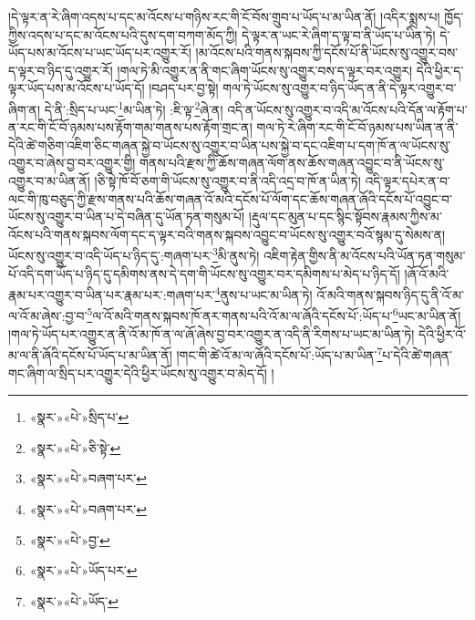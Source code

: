 །དེ་ལྟར་ན་རེ་ཞིག་འདས་པ་དང་མ་འོངས་པ་གཉིས་རང་གི་ངོ་བོས་གྲུབ་པ་ཡོད་པ་མ་ཡིན་ནོ། །འདིར་སྨྲས་པ། ཁྱོད་ཀྱིས་འདས་པ་དང་མ་འོངས་པའི་དུས་དག་བཀག་མོད་ཀྱི། དེ་ལྟར་ན་ཡང་རེ་ཞིག་ད་ལྟ་བ་ནི་ཡོད་པ་ཡིན་ཏེ། དེ་ཡོད་པས་མ་འོངས་པ་ཡང་ཡོད་པར་འགྱུར་རོ། །མ་འོངས་པའི་གནས་སྐབས་ཀྱི་དངོས་པོ་ནི་ཡོངས་སུ་འགྱུར་བས་ད་ལྟར་བ་ཉིད་དུ་འགྱུར་རོ། །གལ་ཏེ་མི་འགྱུར་ན་ནི་གང་ཞིག་ཡོངས་སུ་འགྱུར་བས་ད་ལྟར་བར་འགྱུར། དེའི་ཕྱིར་ད་ལྟར་ཡོད་པས་མ་འོངས་པ་ཡོད་དོ། །བཤད་པར་བྱ་སྟེ། གལ་ཏེ་ཡོངས་སུ་འགྱུར་བ་ཉིད་ཡོད་ན་ནི་དེ་ལྟར་འགྱུར་བ་ཞིག་ན། དེ་ནི་:སྲིད་པ་ཡང་\footnote{«སྣར་»«པེ་»སྲིད་པ་}མ་ཡིན་ཏེ། :ཇི་ལྟ་\footnote{«སྣར་»«པེ་»ཅི་སྟེ་}ཞེ་ན། འདི་ན་ཡོངས་སུ་འགྱུར་བ་འདི་མ་འོངས་པའི་དོན་ལ་རྟོག་པ་ན་རང་གི་ངོ་བོ་ཉམས་པས་རྟོག་གམ་གནས་པས་རྟོག་གྲང་ན། གལ་ཏེ་རེ་ཞིག་རང་གི་ངོ་བོ་ཉམས་པས་ཡིན་ན་ནི་དེའི་ཚེ་གཅིག་འཇིག་ཅིང་གཞན་སྐྱེ་བ་ཡོངས་སུ་འགྱུར་བ་ཡིན་པས་སྐྱེ་བ་དང་འཇིག་པ་དག་ཁོ་ན་ལ་ཡོངས་སུ་འགྱུར་བ་ཞེས་བྱ་བར་འགྱུར་གྱི། གནས་པའི་རྫས་ཀྱི་ཆོས་གཞན་ལོག་ནས་ཆོས་གཞན་འབྱུང་བ་ནི་ཡོངས་སུ་འགྱུར་བ་མ་ཡིན་ནོ། །ཅི་སྟེ་ཁོ་བོ་ཅག་གི་ཡོངས་སུ་འགྱུར་བ་ནི་འདི་འདྲ་བ་ཁོ་ན་ཡིན་ཏེ། འདི་ལྟར་དཔེར་ན་བ་ལང་གི་ཁུ་བཅུད་ཀྱི་རྫས་གནས་པའི་ཆོས་གཞན་འོ་མའི་དངོས་པོ་ལོག་དང་ཆོས་གཞན་ཞོའི་དངོས་པོ་འབྱུང་བ་ཡོངས་སུ་འགྱུར་བ་ཡིན་པ་དེ་བཞིན་དུ་ཡོན་ཏན་གསུམ་པོ། །རྡུལ་དང་མུན་པ་དང་སྙིང་སྟོབས་རྣམས་ཀྱིས་མ་འོངས་པའི་གནས་སྐབས་ལོག་དང་ད་ལྟར་བའི་གནས་སྐབས་འབྱུང་བ་ཡོངས་སུ་འགྱུར་བའོ་སྙམ་དུ་སེམས་ན། ཡོངས་སུ་འགྱུར་བ་འདི་ཡོད་པ་ཉིད་དུ་:གཞག་པར་\footnote{«སྣར་»«པེ་»བཞག་པར་}མི་ནུས་ཏེ། འཇིག་རྟེན་གྱིས་ནི་མ་འོངས་པའི་ཡོན་ཏན་གསུམ་པོ་འདི་དག་ཡོད་པ་ཉིད་དུ་དམིགས་ནས་དེ་དག་གི་ཡོངས་སུ་འགྱུར་བར་དམིགས་པ་མེད་པ་ཉིད་དོ། །ཞོ་འོ་མའི་རྣམ་པར་འགྱུར་བ་ཡིན་པར་རྣམ་པར་:གཞག་པར་\footnote{«སྣར་»«པེ་»བཞག་པར་}ནུས་པ་ཡང་མ་ཡིན་ཏེ། འོ་མའི་གནས་སྐབས་ཉིད་དུ་ནི་འོ་མ་ལ་འོ་མ་ཞེས་:བྱ་བ་\footnote{«སྣར་»«པེ་»བྱ་}ལ་འོ་མའི་གནས་སྐབས་ཁོ་ནར་གནས་པའི་འོ་མ་ལ་ཞོའི་དངོས་པོ་:ཡོད་པ་\footnote{«སྣར་»«པེ་»ཡོད་པར་}ཡང་མ་ཡིན་ནོ། །གལ་ཏེ་ཡོད་པར་འགྱུར་ན་ནི་འོ་མ་ཁོ་ན་ལ་ཞོ་ཞེས་བྱ་བར་འགྱུར་ན་འདི་ནི་རིགས་པ་ཡང་མ་ཡིན་ཏེ། དེའི་ཕྱིར་འོ་མ་ལ་ནི་ཞོའི་དངོས་པོ་ཡོད་པ་མ་ཡིན་ནོ། །གང་གི་ཚེ་འོ་མ་ལ་ཞོའི་དངོས་པོ་:ཡོད་པ་མ་ཡིན་\footnote{«སྣར་»«པེ་»ཡོད་}པ་དེའི་ཚེ་གཞན་གང་ཞིག་ལ་སྲིད་པར་འགྱུར་དེའི་ཕྱིར་ཡོངས་སུ་འགྱུར་བ་མེད་དོ། །
